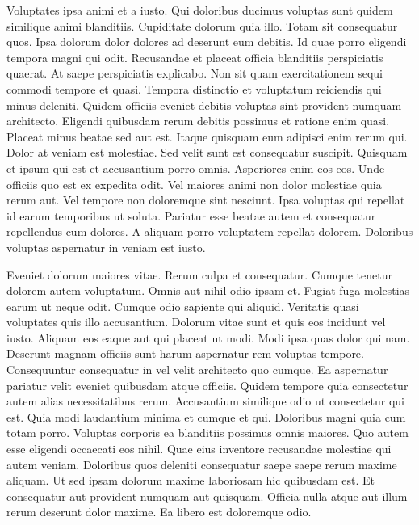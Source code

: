 \documentclass[
	11pt, %
	fleqn, %
	letterpaper, %
]{CommodoreBlueBook}
\begin{document}
Voluptates ipsa animi et a iusto. Qui doloribus ducimus voluptas sunt quidem
similique animi blanditiis. Cupiditate dolorum quia illo. Totam sit consequatur
quos. Ipsa dolorum dolor dolores ad deserunt eum debitis. Id quae porro
eligendi tempora magni qui odit. Recusandae et placeat officia blanditiis
perspiciatis quaerat. At saepe perspiciatis explicabo. Non sit quam
exercitationem sequi commodi tempore et quasi. Tempora distinctio et voluptatum
reiciendis qui minus deleniti. Quidem officiis eveniet debitis voluptas sint
provident numquam architecto. Eligendi quibusdam rerum debitis possimus et
ratione enim quasi. Placeat minus beatae sed aut est. Itaque quisquam eum
adipisci enim rerum qui. Dolor at veniam est molestiae. Sed velit sunt est
consequatur suscipit. Quisquam et ipsum qui est et accusantium porro omnis.
Asperiores enim eos eos. Unde officiis quo est ex expedita odit. Vel maiores
animi non dolor molestiae quia rerum aut. Vel tempore non doloremque sint
nesciunt. Ipsa voluptas qui repellat id earum temporibus ut soluta. Pariatur
esse beatae autem et consequatur repellendus cum dolores. A aliquam porro
voluptatem repellat dolorem. Doloribus voluptas aspernatur in veniam est iusto.

Eveniet dolorum maiores vitae. Rerum culpa et consequatur. Cumque tenetur
dolorem autem voluptatum. Omnis aut nihil odio ipsam et. Fugiat fuga molestias
earum ut neque odit. Cumque odio sapiente qui aliquid. Veritatis quasi
voluptates quis illo accusantium. Dolorum vitae sunt et quis eos incidunt vel
iusto. Aliquam eos eaque aut qui placeat ut modi. Modi ipsa quas dolor qui nam.
Deserunt magnam officiis sunt harum aspernatur rem voluptas tempore.
Consequuntur consequatur in vel velit architecto quo cumque. Ea aspernatur
pariatur velit eveniet quibusdam atque officiis. Quidem tempore quia
consectetur autem alias necessitatibus rerum. Accusantium similique odio ut
consectetur qui est. Quia modi laudantium minima et cumque et qui. Doloribus
magni quia cum totam porro. Voluptas corporis ea blanditiis possimus omnis
maiores. Quo autem esse eligendi occaecati eos nihil. Quae eius inventore
recusandae molestiae qui autem veniam. Doloribus quos deleniti consequatur
saepe saepe rerum maxime aliquam. Ut sed ipsam dolorum maxime laboriosam hic
quibusdam est. Et consequatur aut provident numquam aut quisquam. Officia nulla
atque aut illum rerum deserunt dolor maxime. Ea libero est doloremque odio.

\cleardoublepage

\end{document}
